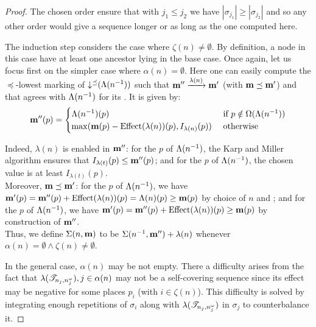 \begin{proof}
  The chosen order ensure that with $j_1 \leq j_2$ we have $|\sigma_{j_1}| \geq |\sigma_{j_2}|$ and so any other order would give a sequence longer or as long as the one computed here.


  The induction step considers the case where $\zeta(n) \neq \emptyset$.
  By definition, a node in this case have at least one ancestor lying in the base case.
  Once again, let us focus first on the simpler case where $\alpha(n) = \emptyset$.
  Here one can easily compute the $\preceq$-lowest marking \marpp of $\operatorname{\downarrow^\preceq}(\Lambda(n^{-1}))$ such that $\mathbf{m''} \xrightarrow{\lambda(n)} \mathbf{m'}$ (with $\mathbf{m} \preceq \mathbf{m'}$) and that agrees with $\Lambda(n^{-1})$ for its \noplaces. It is given by:
  \[
    \mathbf{m''}(p) = \begin{cases}
      \Lambda(n^{-1})(p)
        &\text{ if } p \notin \Omega(\Lambda(n^{-1})) \\
      \max(\mathbf{m}(p) - \operatorname{Effect}(\lambda(n))(p), I_{\lambda(n)}(p))
        &\text{ otherwise}
    \end{cases}
  \]

  Indeed, %
  $\lambda(n)$ is enabled in $\mathbf{m''}$:
  for the \noplaces $p$ of $\Lambda(n^{-1})$, the Karp and Miller algorithm ensures that $I_{\lambda(t)}(p) \leq \mathbf{m''}(p)$;
  and for the \oplaces $p$ of $\Lambda(n^{-1})$, the chosen value is at least $I_{\lambda(t)}(p)$.\\
  Moreover, %
  $\mathbf{m} \preceq \mathbf{m'}$:
  for the \noplaces $p$ of $\Lambda(n^{-1})$, we have $\mathbf{m'}(p) = \mathbf{m''}(p) + \operatorname{Effect}(\lambda(n))(p) = \Lambda(n)(p) \geq \mathbf{m}(p)$ by choice of $n$ and \mar;
  and for the \oplaces $p$ of $\Lambda(n^{-1})$, we have $\mathbf{m'}(p) = \mathbf{m''}(p) + \operatorname{Effect}(\lambda(n))(p) \geq \mathbf{m}(p)$ by construction of $\mathbf{m''}$.\\
  Thus, we define
  $\Sigma(n, \mathbf{m})$ to be $\Sigma(n^{-1}, \mathbf{m''}) + \lambda(n)$
  whenever
  $\alpha(n) = \emptyset \wedge \zeta(n) \neq \emptyset$.

  In the general case, $\alpha(n)$ may be not empty.
  There a difficulty arises from the fact that $\lambda(\mathscr{T}_{n_j,n^\omega_j}), j \in \alpha(n)$ may not be a self-covering sequence since its effect may be negative for some places $p_i$ (with $i \in \zeta(n)$).
  This difficulty is solved by integrating enough repetitions of $\sigma_i$ along with $\lambda(\mathscr{T}_{n_j,n^\omega_j})$ in $\sigma_j$ to counterbalance it.


\end{proof}
